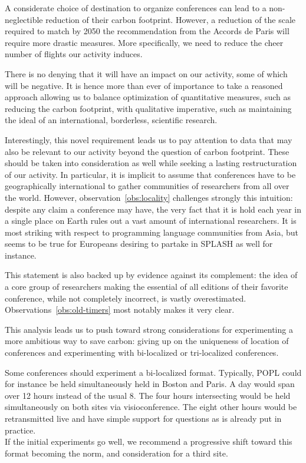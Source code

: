 A considerate choice of destination to organize conferences can lead to a
non-neglectible reduction of their carbon footprint. However, a reduction of
the scale required to match by 2050 the recommendation from the Accords de Paris
will require more drastic measures. More specifically, we need to reduce the cheer
number of flights our activity induces.

There is no denying that it will have an impact on our activity, some of which will
be negative. It is hence more than ever of importance to take a reasoned approach
allowing us to balance optimization of quantitative measures, such as reducing the
carbon footprint, with qualitative imperative, such as maintaining the ideal of
an international, borderless, scientific research.

Interestingly, this novel requirement leads us to pay attention to data that may also be
relevant to our activity beyond the question of carbon footprint. These should be
taken into consideration as well while seeking a lasting restructuration of our
activity. In particular, it is implicit to assume that conferences have to be
geographically international to gather communities of researchers from all over the
world. However, observation~\ref{obs:locality} challenges strongly this intuition:
despite any claim a conference may have, the very fact that it is hold each year in
a single place on Earth rules out a vast amount of international researchers. It is most
striking with respect to programming language communities from Asia, but seems to be
true for Europeans desiring to partake in SPLASH as well for instance.

This statement is also backed up by evidence against its complement: the idea of a core
group of researchers making the essential of all editions of their favorite conference,
while not completely incorrect, is vastly overestimated. Observations~\ref{obs:old-timers}
most notably makes it very clear.

This analysis leads us to push toward strong considerations for experimenting a more
ambitious way to save carbon: giving up on the uniqueness of location of conferences and
experimenting with bi-localized or tri-localized conferences.

\begin{recommend}
  Some conferences should experiment a bi-localized format. Typically, POPL could for
  instance be held simultaneously held in Boston and Paris. A day would span over 12 hours
  instead of the usual 8. The four hours intersecting would be held simultaneously on
  both sites via visioconference. The eight other hours would be retransmitted live and
  have simple support for questions as is already put in practice.\\
  If the initial experiments go well, we recommend a progressive shift toward this
  format becoming the norm, and consideration for a third site.
\end{recommend}

